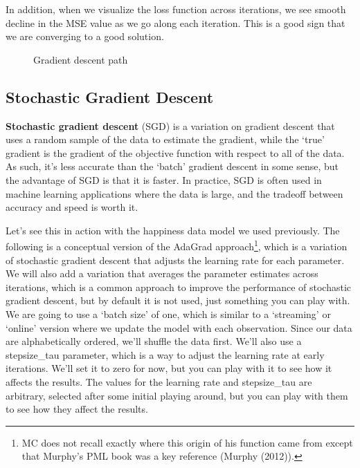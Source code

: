 \documentclass[
  letterpaper,
]{krantz}
\begin{document}
In addition, when we visualize the loss function across iterations, we
see smooth decline in the MSE value as we go along each iteration. This
is a good sign that we are converging to a good solution.

\begin{figure}[H]


\caption{\label{fig-r-gradient-descent}Gradient descent path}

\end{figure}%

\subsection{Stochastic Gradient Descent}\label{sec-estim-opt-algos-sgd}

\textbf{Stochastic gradient descent} (SGD) is a variation on gradient
descent that uses a random sample of the data to estimate the gradient,
while the `true' gradient is the gradient of the objective function with
respect to all of the data. As such, it's less accurate than the `batch'
gradient descent in some sense, but the advantage of SGD is that it is
faster. In practice, SGD is often used in machine learning applications
where the data is large, and the tradeoff between accuracy and speed is
worth it.

Let's see this in action with the happiness data model we used
previously. The following is a conceptual version of the AdaGrad
approach\footnote{MC does not recall exactly where this origin of his
  function came from except that Murphy's PML book was a key reference
  (Murphy (2012)).}, which is a variation of stochastic gradient descent
that adjusts the learning rate for each parameter. We will also add a
variation that averages the parameter estimates across iterations, which
is a common approach to improve the performance of stochastic gradient
descent, but by default it is not used, just something you can play
with. We are going to use a `batch size' of one, which is similar to a
`streaming' or `online' version where we update the model with each
observation. Since our data are alphabetically ordered, we'll shuffle
the data first. We'll also use a stepsize\_tau parameter, which is a way
to adjust the learning rate at early iterations. We'll set it to zero
for now, but you can play with it to see how it affects the results. The
values for the learning rate and stepsize\_tau are arbitrary, selected
after some initial playing around, but you can play with them to see how
they affect the results.
\end{document}
